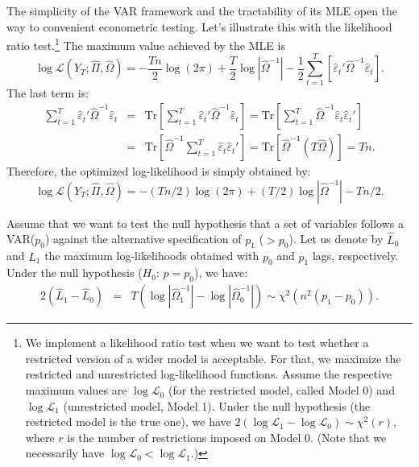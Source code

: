 \documentclass[
  12pt,
]{book}
\theoremstyle{definition}
\theoremstyle{definition}
\theoremstyle{definition}
\theoremstyle{definition}
\theoremstyle{remark}
\begin{document}
The simplicity of the VAR framework and the tractability of its MLE open the way to convenient econometric testing. Let's illustrate this with the likelihood ratio test.\footnote{We implement a likelihood ratio test when we want to test whether a restricted version of a wider model is acceptable. For that, we maximize the restricted and unrestricted log-likelihood functions. Assume the respective maximum values are \(\log \mathcal{L}_0\) (for the restricted model, called Model 0) and \(\log \mathcal{L}_1\) (unrestricted model, Model 1). Under the null hypothesis (the restricted model is the true one), we have \(2(\log \mathcal{L}_1 - \log \mathcal{L}_0) \sim \chi^2(r)\), where \(r\) is the number of restrictions imposed on Model 0. (Note that we necessarily have \(\log \mathcal{L}_0 < \log \mathcal{L}_1\).)} The maximum value achieved by the MLE is
\[
\log\mathcal{L}(Y_{T};\hat{\Pi},\hat{\Omega}) = -\frac{Tn}{2}\log(2\pi)+\frac{T}{2}\log\left|\hat{\Omega}^{-1}\right| -\frac{1}{2}\sum_{t=1}^{T}\left[\hat{\varepsilon}_{t}'\hat{\Omega}^{-1}\hat{\varepsilon}_{t}\right].
\]
The last term is:
\begin{eqnarray*}
\sum_{t=1}^{T}\hat{\varepsilon}_{t}'\hat{\Omega}^{-1}\hat{\varepsilon}_{t} &=& \mbox{Tr}\left[\sum_{t=1}^{T}\hat{\varepsilon}_{t}'\hat{\Omega}^{-1}\hat{\varepsilon}_{t}\right] = \mbox{Tr}\left[\sum_{t=1}^{T}\hat{\Omega}^{-1}\hat{\varepsilon}_{t}\hat{\varepsilon}_{t}'\right]\\
&=&\mbox{Tr}\left[\hat{\Omega}^{-1}\sum_{t=1}^{T}\hat{\varepsilon}_{t}\hat{\varepsilon}_{t}'\right] = \mbox{Tr}\left[\hat{\Omega}^{-1}\left(T\hat{\Omega}\right)\right]=Tn.
\end{eqnarray*}
Therefore, the optimized log-likelihood is simply obtained by:
\begin{equation}
\log\mathcal{L}(Y_{T};\hat{\Pi},\hat{\Omega})=-(Tn/2)\log(2\pi)+(T/2)\log\left|\hat{\Omega}^{-1}\right|-Tn/2.\label{eq:optimzedLogL}
\end{equation}

Assume that we want to test the null hypothesis that a set of variables follows a VAR(\(p_{0}\)) against the alternative specification of \(p_{1}\) (\(>p_{0}\)). Let us denote by \(\hat{L}_{0}\) and \(\hat{L}_{1}\) the maximum log-likelihoods obtained with \(p_{0}\) and \(p_{1}\) lags, respectively. Under the null hypothesis (\(H_0\): \(p=p_0\)), we have:
\begin{eqnarray*}
2\left(\hat{L}_{1}-\hat{L}_{0}\right)&=&T\left(\log\left|\hat{\Omega}_{1}^{-1}\right|-\log\left|\hat{\Omega}_{0}^{-1}\right|\right)  \sim \chi^2(n^{2}(p_{1}-p_{0})).
\end{eqnarray*}
\end{document}
